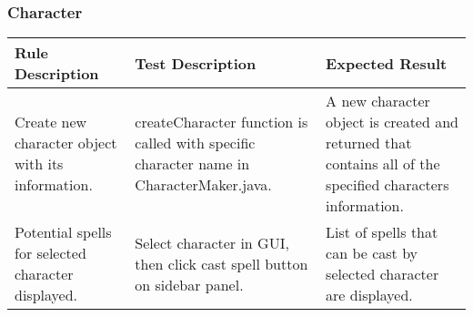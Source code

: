 \subsubsection{Character}
\begin{center}
\begin{supertabular}{|p{4.5cm}|p{4.5cm}|p{4.5cm}|}
\hline
    \textbf{Rule Description}
    &
    \textbf{Test Description}
    &
    \textbf{Expected Result}
\\\hline
    Create new character object with its information.
    &
    createCharacter function is called with 
    specific character name in CharacterMaker.java.
    &
    A new character object is created and returned 
    that contains all of the specified characters information. 
\\\hline 
    Potential spells for selected character displayed.
    &
    Select character in GUI, then click cast spell button on sidebar panel.
    &
    List of spells that can be cast by selected character are displayed.
\\\hline    
\end{supertabular}
\end{center}
